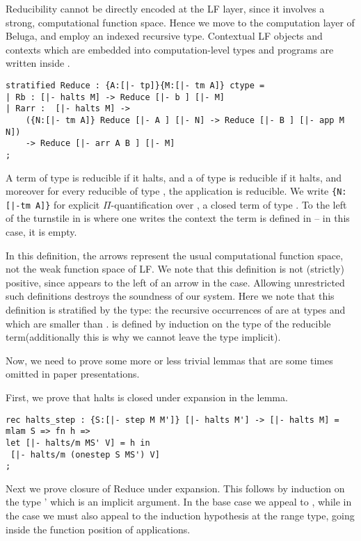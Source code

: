 Reducibility cannot be directly encoded at the LF layer, since it
involves a strong, computational function space. Hence we move to the
computation layer of Beluga, and employ an indexed recursive
type. Contextual LF objects and contexts which are embedded into
computation-level types and programs are written inside \bel{[ ]}.

\begin{lstlisting}
stratified Reduce : {A:[|- tp]}{M:[|- tm A]} ctype =
| Rb : [|- halts M] -> Reduce [|- b ] [|- M]
| Rarr :  [|- halts M] ->
    ({N:[|- tm A]} Reduce [|- A ] [|- N] -> Reduce [|- B ] [|- app M N])
    -> Reduce [|- arr A B ] [|- M]
;
\end{lstlisting}

A term of type  is reducible if it halts, and a  of type
 is reducible if it halts, and moreover for every reducible
 of type , the application  is reducible. We write
\lstinline!{N:[|-tm A]}! for explicit $\Pi$-quantification over , a closed term
of type . To the left of the turnstile in \bel{[|- tm A]} is where one
writes the context the term is defined in -- in this case, it is empty.

In this definition, the arrows represent the usual computational
function space, not the weak function space of LF. We note that this
definition is not (strictly) positive, since  appears to the
left of an arrow in the  case. Allowing unrestricted such
definitions destroys the soundness of our system. Here we note that
this definition is stratified by the type: the recursive occurrences
of  are at types  and  which are smaller than .
 is defined by induction on the type of the reducible
term(additionally this is why we cannot leave the type implicit).

Now, we need to prove some more or less trivial lemmas that are
some times omitted in paper presentations.

First, we prove that halts is closed under expansion in the  lemma.

\begin{lstlisting}
rec halts_step : {S:[|- step M M']} [|- halts M'] -> [|- halts M] =
mlam S => fn h =>
let [|- halts/m MS' V] = h in
 [|- halts/m (onestep S MS') V]
;
\end{lstlisting}

Next we prove closure of Reduce under expansion. This follows by
induction on the type ' which is an implicit argument. In the
base case we appeal to , while in the  case
we must also appeal to the induction hypothesis at the range type,
going inside the function position of applications.

